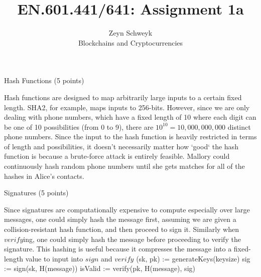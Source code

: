 \documentclass[12pt]{article}
\newenvironment{question}[2][Question]{\begin{trivlist}
\item[\hskip \labelsep {\bfseries #1}\hskip \labelsep {\bfseries #2.}]}{\end{trivlist}}
\begin{document}
 
 
\title{EN.601.441/641: Assignment 1a}%
\author{Zeyn Schweyk\\ %
Blockchains and Cryptocurrencies} %
 
\maketitle
 
\begin{question}{1}{Hash Functions (5 points)} %
\end{question}

Hash functions are designed to map arbitrarily large inputs to a certain fixed length. SHA2, for example, maps inputs to 256-bits. However, since we are only dealing with phone numbers, which have a fixed length of 10 where each digit can be one of 10 possibilities (from 0 to 9), there are $10^{10}=10,000,000,000$ distinct phone numbers. Since the input to the hash function is heavily restricted in terms of length and possibilities, it doesn't necessarily matter how `good` the hash function is because a brute-force attack is entirely feasible. Mallory could continuously hash random phone numbers until she gets matches for all of the hashes in Alice's contacts.





\begin{question}{2}{Signatures (5 points)} %
\end{question}
 
Since signatures are computationally expensive to compute especially over large messages, one could simply hash the message first, assuming we are given a collision-resistant hash function, and then proceed to sign it. Similarly when $verify$ing, one could simply hash the message before proceeding to verify the signature. This hashing is useful because it compresses the message into a fixed-length value to input into $sign$ and $verify$ \newline
(sk, pk) := generateKeys(keysize) \newline
sig := sign(sk, H(message)) \newline
isValid := verify(pk, H(message), sig)
\end{document}
